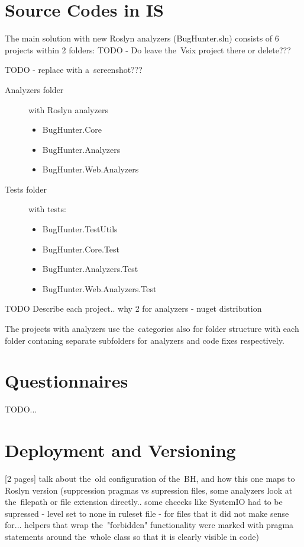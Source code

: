 \documentclass[
  digital, %
  table,   %
  lof,     %
  lot,     %
  oneside,
]{fithesis3}
\begin{document}
	\appendix %
  \chapter{Source Codes in IS}
  The main solution with new Roslyn analyzers (BugHunter.sln) consists of 6 projects within 2 folders: TODO - Do leave the~Vsix project there or delete???

TODO - replace with a~screenshot???
\begin{description}
  \item[Analyzers folder] with Roslyn analyzers
  \begin{itemize}
    \item BugHunter.Core
    \item BugHunter.Analyzers
    \item BugHunter.Web.Analyzers
  \end{itemize}
  
  \item[Tests folder] with tests:
  \begin{itemize}
    \item BugHunter.TestUtils
    \item BugHunter.Core.Test
    \item BugHunter.Analyzers.Test
    \item BugHunter.Web.Analyzers.Test
  \end{itemize}
\end{description}

TODO Describe each project.. why 2 for analyzers - nuget distribution

The projects with analyzers use the~categories also for folder structure with each folder contaning separate subfolders for analyzers and code fixes respectively.
  \chapter{Questionnaires}
TODO...

  \chapter{Deployment and Versioning}
[2 pages]
talk about the~old configuration of the~BH, and how this one maps to Roslyn version (suppression pragmas vs supression files, some analyzers look at the~filepath or file extension directly.. some chcecks like SystemIO had to be supressed - level set to none in ruleset file - for files that it did not make sense for... helpers that wrap the~"forbidden" functionality were marked with pragma statements around the~whole class so that it is clearly visible in code)
\end{document}

